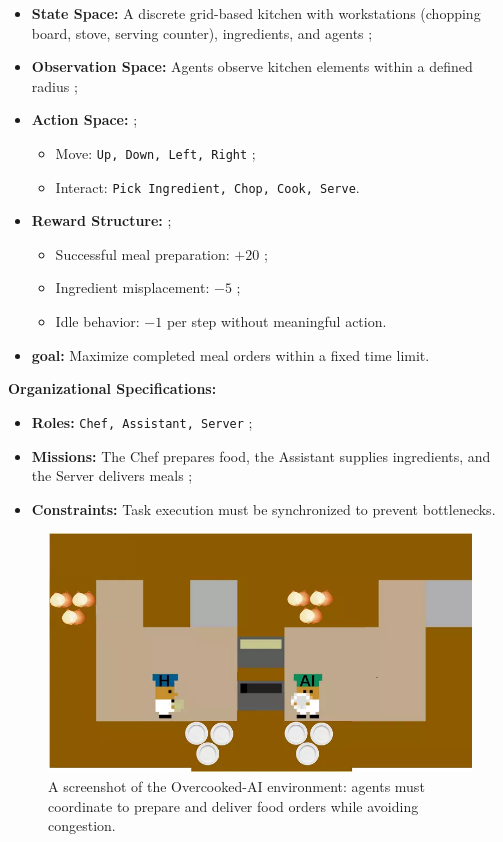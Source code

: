 \documentclass[journal]{IEEEtai}
\begin{document}
\begin{itemize}
    \item \textbf{State Space:} A discrete grid-based kitchen with workstations (chopping board, stove, serving counter), ingredients, and agents ;
    \item \textbf{Observation Space:} Agents observe kitchen elements within a defined radius ;
    \item \textbf{Action Space:}  ;
    \begin{itemize}
        \item Move: \texttt{Up, Down, Left, Right} ;
        \item Interact: \texttt{Pick Ingredient, Chop, Cook, Serve}.
    \end{itemize}
    \item \textbf{Reward Structure:} ;
    \begin{itemize}
        \item Successful meal preparation: $+20$ ;
        \item Ingredient misplacement: $-5$ ;
        \item Idle behavior: $-1$ per step without meaningful action.
    \end{itemize}
    \item \textbf{goal:} Maximize completed meal orders within a fixed time limit.
\end{itemize}

\textbf{Organizational Specifications:} 
\begin{itemize}
    \item \textbf{Roles:} \texttt{Chef, Assistant, Server} ;
    \item \textbf{Missions:} The Chef prepares food, the Assistant supplies ingredients, and the Server delivers meals ;
    \item \textbf{Constraints:} Task execution must be synchronized to prevent bottlenecks.
\end{itemize}

\begin{figure}[h!]
    \centering
    \includegraphics[width=0.7\linewidth]{figures/overcooked.png}
    \caption{A screenshot of the Overcooked-AI environment: agents must coordinate to prepare and deliver food orders while avoiding congestion.}
    \label{fig:overcooked}
\end{figure}
\end{document}
